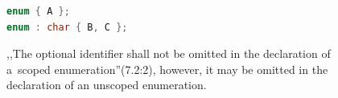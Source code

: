 \documentclass{fithesis3}
\begin{document}
\begin{figure}
\begin{lstlisting}[language=C++]
enum { A };
enum : char { B, C };
\end{lstlisting}
\caption{,,The optional identifier shall not be omitted in the declaration of a~scoped enumeration''(7.2:2), however, it may be omitted in the declaration of an unscoped enumeration.}
\end{figure}














\end{document}
